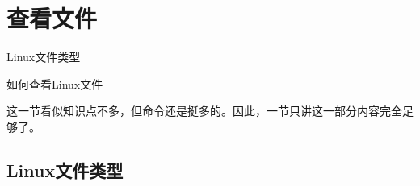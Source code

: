 \section{查看文件}\label{sec:查看文件}

\begin{Abstract}
    \item Linux文件类型
    \item 如何查看Linux文件
\end{Abstract}


这一节看似知识点不多，但命令还是挺多的。因此，一节只讲这一部分内容完全足够了。

\subsection{Linux文件类型}\label{subsec:查看文件-Linux文件类型}

